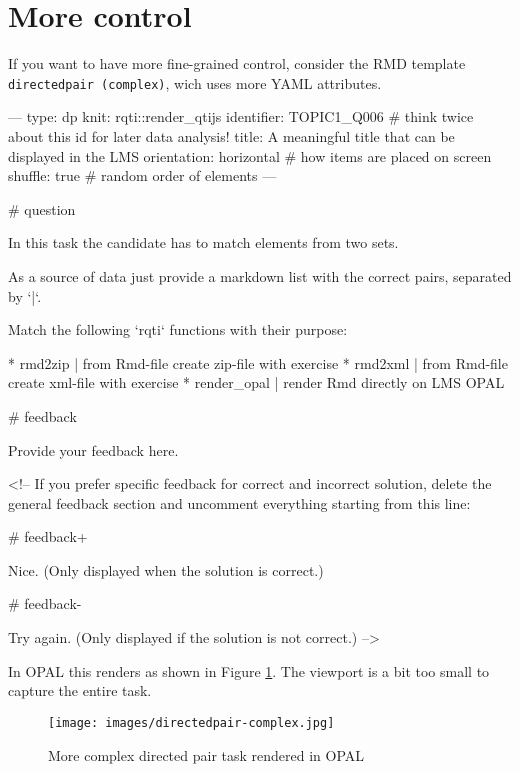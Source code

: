 \documentclass[twoside]{tufte-book}
\newenvironment{Shaded}{}{}
\begin{document}
\section{More control}\label{more-control-6}

If you want to have more fine-grained control, consider the RMD template \texttt{directedpair\ (complex)}, wich uses more YAML attributes.

\begin{Shaded}
\begin{Highlighting}
---
type: dp
knit: rqti::render_qtijs
identifier: TOPIC1_Q006 # think twice about this id for later data analysis!
title: A meaningful title that can be displayed in the LMS
orientation: horizontal # how items are placed on screen
shuffle: true # random order of elements
---

# question

In this task the candidate has to match elements from two sets.

As a source of data just provide a markdown list with the correct pairs,
separated by `|`.

Match the following `rqti` functions with their purpose:

* rmd2zip | from Rmd-file create zip-file with exercise
* rmd2xml | from Rmd-file create xml-file with exercise
* render_opal | render Rmd directly on LMS OPAL


# feedback

Provide your feedback here.

<!-- If you prefer specific feedback for correct and incorrect solution, delete
the general feedback section and uncomment everything starting from this line:

# feedback+

Nice. (Only displayed when the solution is correct.)

# feedback-

Try again. (Only displayed if the solution is not correct.)
-->
\end{Highlighting}
\end{Shaded}

In OPAL this renders as shown in Figure \ref{dp2opal}. The viewport is a bit too small to capture the entire task.

\begin{figure}
\centering
\texttt{[image: images/directedpair-complex.jpg]}
\caption{\label{dp2opal}More complex directed pair task rendered in OPAL}
\end{figure}
\end{document}
